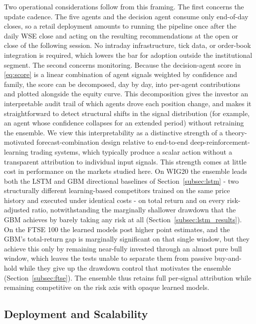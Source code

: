 \documentclass{ieeeaccess}
\begin{document}
Two operational considerations follow from this framing. The first concerns the update cadence. The five agents and the decision agent consume only end-of-day closes, so a retail deployment amounts to running the pipeline once after the daily WSE close and acting on the resulting recommendations at the open or close of the following session. No intraday infrastructure, tick data, or order-book integration is required, which lowers the bar for adoption outside the institutional segment. The second concerns monitoring. Because the decision-agent score in \eqref{eq:score} is a linear combination of agent signals weighted by confidence and family, the score can be decomposed, day by day, into per-agent contributions and plotted alongside the equity curve. This decomposition gives the investor an interpretable audit trail of which agents drove each position change, and makes it straightforward to detect structural shifts in the signal distribution (for example, an agent whose confidence collapses for an extended period) without retraining the ensemble. We view this interpretability as a distinctive strength of a theory-motivated forecast-combination design relative to end-to-end deep-reinforcement-learning trading systems, which typically produce a scalar action without a transparent attribution to individual input signals. This strength comes at little cost in performance on the markets studied here. On WIG20 the ensemble leads both the LSTM and GBM directional baselines of Section~\ref{subsec:lstm} - two structurally different learning-based competitors trained on the same price history and executed under identical costs - on total return and on every risk-adjusted ratio, notwithstanding the marginally shallower drawdown that the GBM achieves by barely taking any risk at all (Section~\ref{subsec:lstm_results}). On the FTSE 100 the learned models post higher point estimates, and the GBM's total-return gap is marginally significant on that single window, but they achieve this only by remaining near-fully invested through an almost pure bull window, which leaves the tests unable to separate them from passive buy-and-hold while they give up the drawdown control that motivates the ensemble (Section~\ref{subsec:ftse}). The ensemble thus retains full per-signal attribution while remaining competitive on the risk axis with opaque learned models.

\subsection{Deployment and Scalability}
\label{subsec:deployment}
\end{document}
